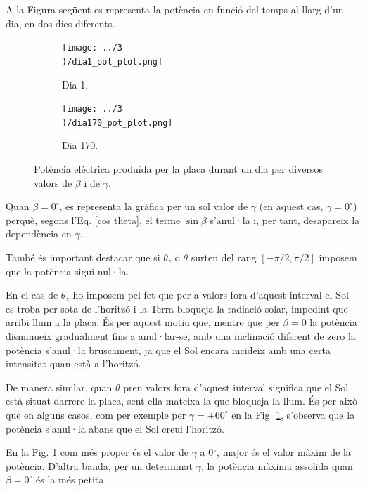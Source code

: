 \documentclass[11pt]{article}
\begin{document}
A la Figura següent es representa la potència en funció del temps al llarg d'un dia, en dos dies diferents.

\begin{figure}[H]
    \centering
    \begin{subfigure}{0.5\textwidth}
        \centering
        \texttt{[image: ../3\\)/dia1\_pot\_plot.png]}
        \caption{Dia 1.}
        \label{fig: potencia dia 1}
    \end{subfigure}%
    \hspace{0.000001\textwidth}%
    \begin{subfigure}{0.5\textwidth}
        \centering
        \texttt{[image: ../3\\)/dia170\_pot\_plot.png]}
        \caption{Dia 170.}
        \label{fig: potencia dia 170}
    \end{subfigure}
    \caption{Potència elèctrica produïda per la placa durant un dia per diversos valors de $\beta$ i de $\gamma$.}
    \label{potencia un dia}
\end{figure}

Quan $\beta=0^{\circ}$, es representa la gràfica per un sol valor de $\gamma$ (en aquest cas, $\gamma=0^{\circ}$) perquè, segons l’Eq. \eqref{cos theta}, el terme $\sin\beta$ s’anul·la i, per tant, desapareix la dependència en $\gamma$.

També és important destacar que si $\theta_z$ o $\theta$ surten del rang $[-\pi/2,\pi/2]$ imposem que la potència sigui nul·la.

En el cas de $\theta_z$ ho imposem pel fet que per a valors fora d'aquest interval el Sol es troba per sota de l'horitzó i la Terra bloqueja la radiació solar, impedint que arribi llum a la placa. És per aquest motiu que, mentre que per $\beta = 0$ la potència disminueix gradualment fins a anul·lar-se, amb una inclinació diferent de zero la potència s'anul·la bruscament, ja que el Sol encara incideix amb una certa intensitat quan està a l’horitzó.

De manera similar, quan $\theta$ pren valors fora d'aquest interval significa que el Sol està situat darrere la placa, sent ella mateixa la que bloqueja la llum. És per això que en alguns casos, com per exemple per $\gamma=\pm60^{\circ}$ en la Fig. \ref{fig: potencia dia 1}, s'observa que la potència s'anul·la abans que el Sol creui l'horitzó.

En la Fig. \ref{fig: potencia dia 1} com més proper és el valor de $\gamma$ a 0$^{\circ}$, major és el valor màxim de la potència. D'altra banda, per un determinat $\gamma$, la potència màxima assolida quan $\beta=0^{\circ}$ és la més petita.
\end{document}
